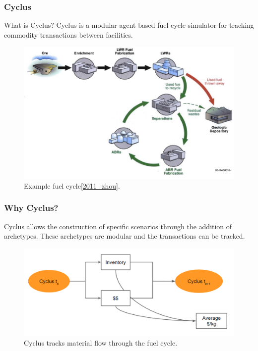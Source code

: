 \begin{frame}
	\frametitle{Cyclus}
    \begin{block}{What is Cyclus?}
    	Cyclus is a modular agent based fuel cycle simulator for tracking commodity transactions
    	between facilities.
    \end{block}
	\begin{figure}
		\centering
		\includegraphics[width=0.6\linewidth]{lanl-fuel-cycle.png}
		\caption{Example fuel cycle\ref{2011_zhou}.}
	\end{figure}
\end{frame}

\begin{frame}
\frametitle{Why Cyclus?}
	Cyclus allows the construction of specific scenarios through the addition of archetypes. These archetypes are
	modular and the transactions can be tracked.
	\begin{figure}
		\centering
		\includegraphics[width=0.9\linewidth]{cyclus-material-track}
		\caption{Cyclus tracks material flow through the fuel cycle.}
		\label{fig:tracking}
	\end{figure}
\end{frame}

